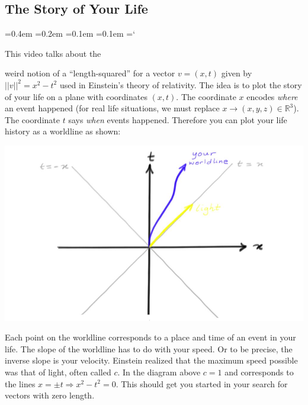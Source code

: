 
\subsection*{The Story of Your Life}

{\ttfamily
{}\font=0.4em
\font=0.2em
\font=0.1em
\font=0.1em
\hyphenchar\font=`\-


\hypertarget{vectors_in_space_n_vectors_hint}{This video talks about the} weird notion of
a ``length-squared'' for a vector $v=(x,t)$ given by $||v||^2=x^2-t^2$ used in Einstein's theory of relativity.
The idea is to plot the story of your life on a plane with coordinates $(x,t)$. The coordinate $x$ encodes
{\itshape where} an event happened (for real life situations, we must replace $x\to (x,y,z)\in {\mathbb R}^3$). 
The coordinate $t$ says {\itshape when} events happened. Therefore you can plot your life history as a worldline
as shown:
\begin{center}
\includegraphics[scale=.2]{worldline.jpg}
\end{center}
Each point on the worldline  corresponds to a place and time of an event in your life. The slope of
the worldline has to do with your speed. Or to be precise, the inverse slope is your velocity. 
Einstein realized that the maximum speed possible was that of light, often called $c$. In the diagram above
$c=1$ and corresponds to the lines $x=\pm t\Rightarrow x^2-t^2=0$. This should get you started in your search for vectors
with zero length.




}

